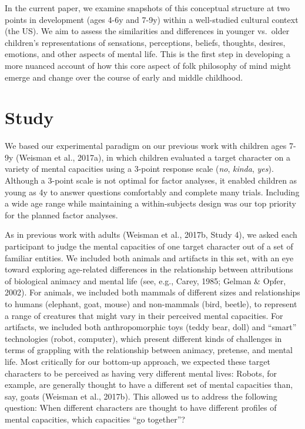 \documentclass[10pt, letterpaper]{article}
\begin{document}
In the current paper, we examine snapshots of this conceptual structure
at two points in development (ages 4-6y and 7-9y) within a well-studied
cultural context (the US). We aim to assess the similarities and
differences in younger vs.~older children's representations of
sensations, perceptions, beliefs, thoughts, desires, emotions, and other
aspects of mental life. This is the first step in developing a more
nuanced account of how this core aspect of folk philosophy of mind might
emerge and change over the course of early and middle childhood.

\section{Study}\label{study}

We based our experimental paradigm on our previous work with children
ages 7-9y (Weisman et al., 2017a), in which children evaluated a target
character on a variety of mental capacities using a 3-point response
scale (\emph{no}, \emph{kinda}, \emph{yes}). Although a 3-point scale is
not optimal for factor analyses, it enabled children as young as 4y to
answer questions comfortably and complete many trials. Including a wide
age range while maintaining a within-subjects design was our top
priority for the planned factor analyses.

As in previous work with adults (Weisman et al., 2017b, Study 4), we
asked each participant to judge the mental capacities of one target
character out of a set of familiar entities. We included both animals
and artifacts in this set, with an eye toward exploring age-related
differences in the relationship between attributions of biological
animacy and mental life (see, e.g., Carey, 1985; Gelman \& Opfer, 2002).
For animals, we included both mammals of different sizes and
relationships to humans (elephant, goat, mouse) and non-mammals (bird,
beetle), to represent a range of creatures that might vary in their
perceived mental capacities. For artifacts, we included both
anthropomorphic toys (teddy bear, doll) and ``smart'' technologies
(robot, computer), which present different kinds of challenges in terms
of grappling with the relationship between animacy, pretense, and mental
life. Most critically for our bottom-up approach, we expected these
target characters to be perceived as having very different mental lives:
Robots, for example, are generally thought to have a different set of
mental capacities than, say, goats (Weisman et al., 2017b). This allowed
us to address the following question: When different characters are
thought to have different profiles of mental capacities, which
capacities ``go together''?
\end{document}
